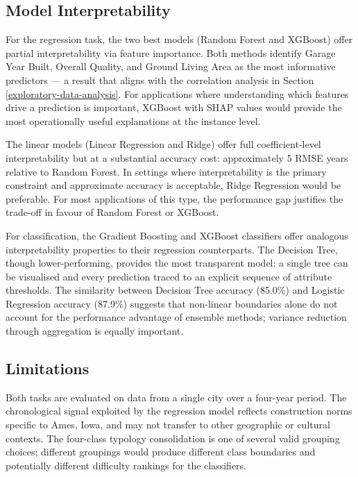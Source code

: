 \documentclass[11pt,a4paper]{article}
\begin{document}
\subsection{Model Interpretability}\label{model-interpretability}

For the regression task, the two best models (Random Forest and XGBoost)
offer partial interpretability via feature importance. Both methods
identify Garage Year Built, Overall Quality, and Ground Living Area as
the most informative predictors --- a result that aligns with the
correlation analysis in Section \ref{exploratory-data-analysis}. For
applications where understanding which features drive a prediction is
important, XGBoost with SHAP values would provide the most operationally
useful explanations at the instance level.

The linear models (Linear Regression and Ridge) offer full
coefficient-level interpretability but at a substantial accuracy cost:
approximately 5 RMSE years relative to Random Forest. In settings where
interpretability is the primary constraint and approximate accuracy is
acceptable, Ridge Regression would be preferable. For most applications
of this type, the performance gap justifies the trade-off in favour of
Random Forest or XGBoost.

For classification, the Gradient Boosting and XGBoost classifiers offer
analogous interpretability properties to their regression counterparts.
The Decision Tree, though lower-performing, provides the most
transparent model: a single tree can be visualised and every prediction
traced to an explicit sequence of attribute thresholds. The similarity
between Decision Tree accuracy (85.0\%) and Logistic Regression accuracy
(87.9\%) suggests that non-linear boundaries alone do not account for
the performance advantage of ensemble methods; variance reduction
through aggregation is equally important.

\subsection{Limitations}\label{limitations}

Both tasks are evaluated on data from a single city over a four-year
period. The chronological signal exploited by the regression model
reflects construction norms specific to Ames, Iowa, and may not transfer
to other geographic or cultural contexts. The four-class typology
consolidation is one of several valid grouping choices; different
groupings would produce different class boundaries and potentially
different difficulty rankings for the classifiers.
\end{document}
